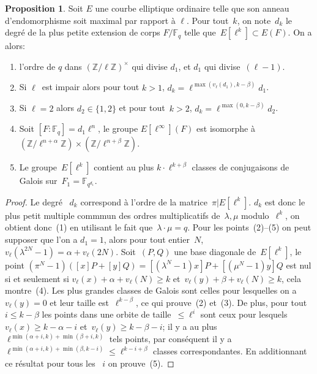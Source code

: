 \documentclass[10pt,a4paper]{book}
\theoremstyle{plain}
\theoremstyle{definition}
\theoremstyle{definition}
\theoremstyle{definition}
\newtheorem{prop}[thm]{Proposition}
\theoremstyle{definition}
\theoremstyle{remark}
\theoremstyle{remark}
\theoremstyle{definition}
\begin{document}
\begin{prop}\label{pro:clas:fro}
Soit $E$ une courbe elliptique ordinaire telle que son anneau d'endomorphisme 
soit maximal par rapport à $\ell$. Pour tout~$k$, on note~$d_k$ le degré de la 
plus petite extension de corps $F/\mathbb{F}_q$ telle que~$E[\ell^k]\subset 
E(F)$. On  a alors:
\begin{enumerate}
\item l'ordre de $q$ dans $(\mathbb{Z}/ \ell \mathbb{Z})^\times$ qui divise $d_1$,
et $d_1$ qui divise~$(\ell-1)$.
\item Si $\ell$~est impair alors pour tout $k > 1$,
$ d_k = \ell^{\max (v_{\ell} (d_1), k - \beta)}d_1$.
\item Si $\ell=2$ alors $d_2 \in \{1,2\}$ et pour tout~$k > 2$,
$d_k = \ell^{\max (0, k - \beta)}d_2$.
\item Soit $[F:\mathbb{F}_q]=d_1\ell^n$, le groupe $E[\ell^{\infty}](F)$ est isomorphe à~$(\mathbb{Z}/\ell^{n+\alpha} \mathbb{Z}) \times (\mathbb{Z}/\ell^{n+\beta} \mathbb{Z})$.
\item\label{prop:classes:count} Le groupe~$E[\ell^k]$ contient au plus
$k \cdot \ell^{k+\beta}$ classes de conjugaisons de Galois sur~$F_1 = \mathbb{F}_{q^{d_1}}$.
\end{enumerate}
\end{prop}
\begin{proof}
Le degré ~$d_k$ correspond à l'ordre de la matrice~$\pi|E[\ell^k]$.
$d_k$ est donc le plus petit multiple commmun des ordres multiplicatifs
de~$\lambda, \mu$ modulo~$\ell^k$,
on obtient donc~(1) en utilisant le fait que~$\lambda \cdot \mu = q$.
Pour les points~(2)--(5) on peut supposer que l'on a $d_1 = 1$,
alors pour tout entier~$N$, $v_{\ell}(\lambda^{2N}-1) = \alpha + v_{\ell} (2N)$.
Soit~$(P, Q)$ une base diagonale de~$E[\ell^k]$,
le point $(\pi^N - 1) ([x] P + [y] Q) = [(\lambda^N-1) x] P + [(\mu^N-1) y] Q$
est nul si et seulement si $v_{\ell} (x) + \alpha + v_{\ell} (N) \geq k$
et~$v_{\ell} (y) + \beta + v_{\ell} (N) \geq k$, cela montre~(4).
Les plus grandes classes de Galois sont celles pour lesquelles
on a~$v_{\ell} (y) = 0$ et leur taille est~$\ell^{k - \beta}$,
ce qui prouve~(2) et~(3).
De plus, pour tout~$i \leq k-\beta$ les points dans une orbite de taille~$\leqslant \ell^i$
sont ceux pour lesquels~$v_{\ell} (x) \geqslant k - \alpha - i$ et~$v_{\ell} (y) \geqslant k - \beta - i$;
il y a au plus $\ell^{\min(\alpha+i, k) + \min (\beta+i, k)}$ tels points,
par conséquent il y a $\ell^{\min(\alpha+i, k) + \min(\beta, k-i)} \leqslant \ell^{k-i+\beta}$
 classes correspondantes.
En additionnant ce résultat pour tous les ~$i$ on prouve~(5).
\end{proof}
\end{document}
